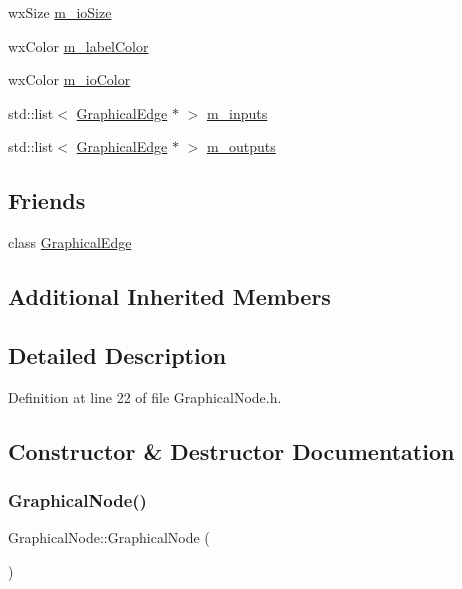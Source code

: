 \begin{DoxyCompactItemize}
\item 
wx\+Size \hyperlink{class_graphical_node_a203b844a6782291e934550ebf9640223}{m\+\_\+io\+Size}
\item 
wx\+Color \hyperlink{class_graphical_node_a11311bff2e360a7441382b1b74db85a8}{m\+\_\+label\+Color}
\item 
wx\+Color \hyperlink{class_graphical_node_a2acac8a373e328b7fd9b627838e04315}{m\+\_\+io\+Color}
\item 
std\+::list$<$ \hyperlink{class_graphical_edge}{Graphical\+Edge} $\ast$ $>$ \hyperlink{class_graphical_node_a82784344a0531de4c11212a13dca28fe}{m\+\_\+inputs}
\item 
std\+::list$<$ \hyperlink{class_graphical_edge}{Graphical\+Edge} $\ast$ $>$ \hyperlink{class_graphical_node_a4c1b0f83285d9425c4b5d8a1b0dc4649}{m\+\_\+outputs}
\end{DoxyCompactItemize}
\subsection*{Friends}
\begin{DoxyCompactItemize}
\item 
class \hyperlink{class_graphical_node_a2a860a1faf189243ba02f50ad8362bfa}{Graphical\+Edge}
\end{DoxyCompactItemize}
\subsection*{Additional Inherited Members}


\subsection{Detailed Description}


Definition at line 22 of file Graphical\+Node.\+h.



\subsection{Constructor \& Destructor Documentation}
\mbox{\label{class_graphical_node_a9c34baa875b133f8c5b1da78da189f1d}} 
\subsubsection{\texorpdfstring{Graphical\+Node()}{GraphicalNode()}\hspace{0.1cm}{\footnotesize\ttfamily [1/5]}}
{\footnotesize\ttfamily Graphical\+Node\+::\+Graphical\+Node (\begin{DoxyParamCaption}{ }\end{DoxyParamCaption})}



